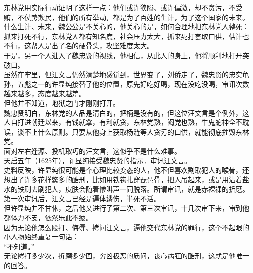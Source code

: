 \begin{multicols}{\theparacolNo}
东林党用实际行动证明了这样一点：他们或许狭隘、或许偏激，却不贪污，不受贿，不仗势欺民，他们的所有举动，都是为了百姓的生计，为了这个国家的未来。\\

什么生计、未来，魏公公是不关心的，他关心的是，如何合理地把东林党人整死：抓来打死不行，东林党人都有知名度，社会压力太大，抓来死打套取口供，估计也不行，这帮人是出了名的硬骨头，攻坚难度太大。\\

于是，另一个人进入了魏忠贤的视线，他相信，从此人的身上，他将顺利地打开突破口。\\

虽然在牢里，但汪文言仍然清楚地感觉到，世界变了，刘侨走了，魏忠贤的忠实龟孙，五彪之一的许显纯接替了他的位置，原先好吃好喝，现在没吃没喝，审讯次数越来越多，态度越来越差。\\

但他并不知道，地狱之门才刚刚打开。\\

魏忠贤明白，东林党的人品是清白的，把柄是没有的，但这位汪文言是个例外，这人自打进朝廷以来，有钱就拿，有利就贪，东林党熟，阉党也熟，牛鬼蛇神全不耽误，谈不上什么原则。只要从他身上获取杨涟等人贪污的口供，就能彻底摧毁东林党。\\

面对左右逢源、投机取巧的汪文言，这似乎不是什么难事。\\

天启五年（1625年），许显纯接受魏忠贤的指示，审讯汪文言。\\

史料反映，许显纯很可能是个心理比较变态的人，他不但喜欢割取犯人的喉骨，还想出了许多花样繁多的酷刑，比如用铁钩扎穿琵琶骨，把人吊起来，或是用沾着盐水的铁刷去刷犯人，皮肤会随着惨叫声一同脱落。所谓审讯，就是赤裸裸的折磨。\\

第一次审讯后，汪文言已经是遍体鳞伤，半死不活。\\

但许显纯并不甘休，之后他又进行了第二次、第三次审讯，十几次审下来，审到他都体力不支，依然乐此不疲。\\

因为无论他怎么殴打、侮辱、拷问汪文言，逼他交代东林党的罪行，这个不起眼的小人物始终重复一句话：\\

“不知道。”\\

无论拷打多少次，折磨多少回，穷凶极恶的质问，丧心病狂的酷刑，这就是他唯一的回答。\\


\end{multicols}
